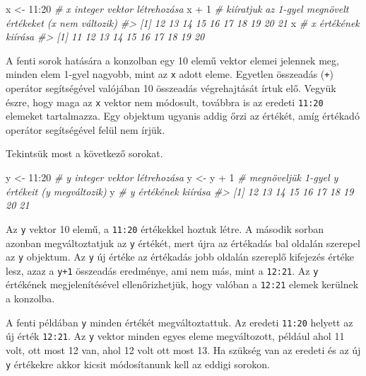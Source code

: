 \documentclass[
]{book}
\newenvironment{Shaded}{\begin{snugshade}}{\end{snugshade}}
\newcommand{\CommentTok}[1]{\textcolor[rgb]{0.56,0.35,0.01}{\textit{#1}}}
\newcommand{\DecValTok}[1]{\textcolor[rgb]{0.00,0.00,0.81}{#1}}
\newcommand{\NormalTok}[1]{#1}
\newcommand{\OtherTok}[1]{\textcolor[rgb]{0.56,0.35,0.01}{#1}}
\newcommand{\SpecialCharTok}[1]{\textcolor[rgb]{0.00,0.00,0.00}{#1}}
\begin{document}
\begin{Shaded}
\begin{Highlighting}[]
\NormalTok{x }\OtherTok{\textless{}{-}} \DecValTok{11}\SpecialCharTok{:}\DecValTok{20}         \CommentTok{\# x integer vektor létrehozása}
\NormalTok{x }\SpecialCharTok{+} \DecValTok{1}              \CommentTok{\# kiíratjuk az 1{-}gyel megnövelt értékeket (x nem változik)}
\CommentTok{\#\textgreater{}  [1] 12 13 14 15 16 17 18 19 20 21}
\NormalTok{x                  }\CommentTok{\# x értékének kiírása}
\CommentTok{\#\textgreater{}  [1] 11 12 13 14 15 16 17 18 19 20}
\end{Highlighting}
\end{Shaded}

A fenti sorok hatására a konzolban egy 10 elemű vektor elemei jelennek meg, minden elem 1-gyel nagyobb, mint az \texttt{x} adott eleme. Egyetlen összeadás (\texttt{+}) operátor segítségével valójában 10 összeadás végrehajtását írtuk elő. Vegyük észre, hogy maga az \texttt{x} vektor nem módosult, továbbra is az eredeti \texttt{11:20} elemeket tartalmazza. Egy objektum ugyanis addig őrzi az értékét, amíg értékadó operátor segítségével felül nem írjük.

Tekintsük most a következő sorokat.

\begin{Shaded}
\begin{Highlighting}[]
\NormalTok{y }\OtherTok{\textless{}{-}} \DecValTok{11}\SpecialCharTok{:}\DecValTok{20}         \CommentTok{\# y integer vektor létrehozása}
\NormalTok{y }\OtherTok{\textless{}{-}}\NormalTok{ y }\SpecialCharTok{+} \DecValTok{1}         \CommentTok{\# megnöveljük 1{-}gyel y értékeit (y megváltozik)}
\NormalTok{y                  }\CommentTok{\# y értékének kiírása }
\CommentTok{\#\textgreater{}  [1] 12 13 14 15 16 17 18 19 20 21}
\end{Highlighting}
\end{Shaded}

Az \texttt{y} vektor 10 elemű, a \texttt{11:20} értékekkel hoztuk létre. A második sorban azonban megváltoztatjuk az \texttt{y} értékét, mert újra az értékadás bal oldalán szerepel az \texttt{y} objektum. Az \texttt{y} új értéke az értékadás jobb oldalán szereplő kifejezés értéke lesz, azaz a \texttt{y+1} összeadás eredménye, ami nem más, mint a \texttt{12:21}. Az \texttt{y} értékének megjelenítésével ellenőrizhetjük, hogy valóban a \texttt{12:21} elemek kerülnek a konzolba.

A fenti példában \texttt{y} minden értékét megváltoztattuk. Az eredeti \texttt{11:20} helyett az új érték \texttt{12:21}. Az \texttt{y} vektor minden egyes eleme megváltozott, például ahol 11 volt, ott most 12 van, ahol 12 volt ott most 13. Ha szükség van az eredeti és az új \texttt{y} értékekre akkor kicsit módosítanunk kell az eddigi sorokon.
\end{document}
